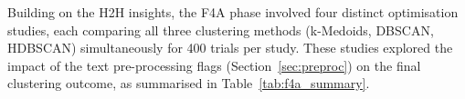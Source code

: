 \documentclass[10pt,oneside]{report}
\begin{document}

Building on the H2H insights, the F4A phase involved four distinct optimisation studies, each comparing all three clustering methods (k-Medoids, DBSCAN, HDBSCAN) simultaneously for 400 trials per study. These studies explored the impact of the text pre-processing flags (Section~\ref{sec:preproc}) on the final clustering outcome, as summarised in Table~\ref{tab:f4a_summary}.

\end{document}
